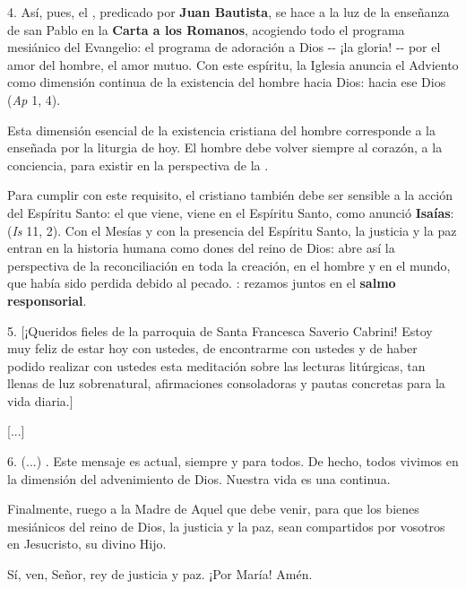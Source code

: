 \begin{body}
\begin{body}
		4. Así, pues, el , predicado por \textbf{Juan Bautista}, se hace a la luz de la enseñanza de san Pablo en la \textbf{Carta a los Romanos}, acogiendo todo el programa mesiánico del Evangelio: el programa de adoración a Dios -\/- ¡la gloria! -\/- por el amor del hombre, el amor mutuo. Con este espíritu, la Iglesia anuncia el Adviento como dimensión continua de la existencia del hombre hacia Dios: hacia ese Dios  (\emph{Ap} 1, 4).
		
		Esta dimensión esencial de la existencia cristiana del hombre corresponde a la  enseñada por la liturgia de hoy. El hombre debe volver siempre al corazón, a la conciencia, para existir en la perspectiva de la .
		
		Para cumplir con este requisito, el cristiano también debe ser sensible a la acción del Espíritu Santo: el que viene, viene en el Espíritu Santo, como anunció \textbf{Isaías}:  (\emph{Is} 11, 2). Con el Mesías y con la presencia del Espíritu Santo, la justicia y la paz entran en la historia humana como dones del reino de Dios: abre así la perspectiva de la reconciliación  en toda la creación, en el hombre y en el mundo, que había sido perdida debido al pecado. : rezamos juntos en el \textbf{salmo responsorial}.
		
		5. {[}¡Queridos fieles de la parroquia de Santa Francesca Saverio Cabrini! Estoy muy feliz de estar hoy con ustedes, de encontrarme con ustedes y de haber podido realizar con ustedes esta meditación sobre las lecturas litúrgicas, tan llenas de luz sobrenatural, afirmaciones consoladoras y pautas concretas para la vida diaria.{]}
		
		{[}...{]}
		
		6. (...) . Este mensaje es actual, siempre y para todos. De hecho, todos vivimos en la dimensión del advenimiento de Dios. Nuestra vida es una  continua.
		
		Finalmente, ruego a la Madre de Aquel que debe venir, para que los bienes mesiánicos del reino de Dios, la justicia y la paz, sean compartidos por vosotros en Jesucristo, su divino Hijo.
		
		Sí, ven, Señor, rey de justicia y paz. ¡Por María! Amén.
	\end{body}
	

\end{body}
